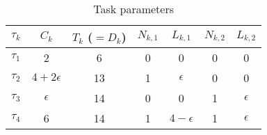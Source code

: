 \begin{table} 
\centering
\caption{Task parameters}
\begin{tabular}{|c|c|c|c|c|c|c|} \hline
$\tau_k$ & $C_k$ & $T_k$ ($= D_k$) & $N_{k,1}$ & $L_{k,1}$ & $N_{k,2}$ & $L_{k,2}$\\ \hline
$\tau_1$ & 2           & 6  & 0 & 0 & 0 & 0\\ \hline
$\tau_2$ & $4+2\epsilon$ & 13 & 1 & $\epsilon$ & 0 & 0\\ \hline
$\tau_3$ & $\epsilon$    & 14 & 0 & 0 & 1 & $\epsilon$\\ \hline
$\tau_4$ & 6             & 14 & 1 & $4-\epsilon$ & 1 & $\epsilon$\\ \hline
\end{tabular}
\label{tab:parameters}
\end{table}

